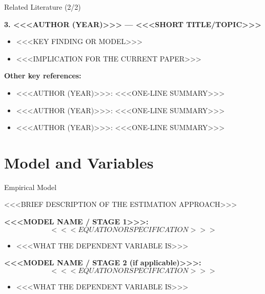 \documentclass[aspectratio=169, 11pt]{beamer}
\begin{document}

\begin{frame}{Related Literature (2/2)}

\textbf{3. <<<AUTHOR (YEAR)>>> --- <<<SHORT TITLE/TOPIC>>>}
\begin{itemize}
  \item <<<KEY FINDING OR MODEL>>>
  \item <<<IMPLICATION FOR THE CURRENT PAPER>>>
\end{itemize}

\bigskip
\textbf{Other key references:}
\begin{itemize}
  \item <<<AUTHOR (YEAR)>>>: <<<ONE-LINE SUMMARY>>>
  \item <<<AUTHOR (YEAR)>>>: <<<ONE-LINE SUMMARY>>>
  \item <<<AUTHOR (YEAR)>>>: <<<ONE-LINE SUMMARY>>>
\end{itemize}

\end{frame}

\section{Model and Variables}

\begin{frame}{Empirical Model}

<<<BRIEF DESCRIPTION OF THE ESTIMATION APPROACH>>>

\bigskip
\textbf{<<<MODEL NAME / STAGE 1>>>:}
\[
<<<EQUATION OR SPECIFICATION>>>
\]
\begin{itemize}
  \item <<<WHAT THE DEPENDENT VARIABLE IS>>>
\end{itemize}

\bigskip
\textbf{<<<MODEL NAME / STAGE 2 (if applicable)>>>:}
\[
<<<EQUATION OR SPECIFICATION>>>
\]
\begin{itemize}
  \item <<<WHAT THE DEPENDENT VARIABLE IS>>>
\end{itemize}

\end{frame}

\end{document}
